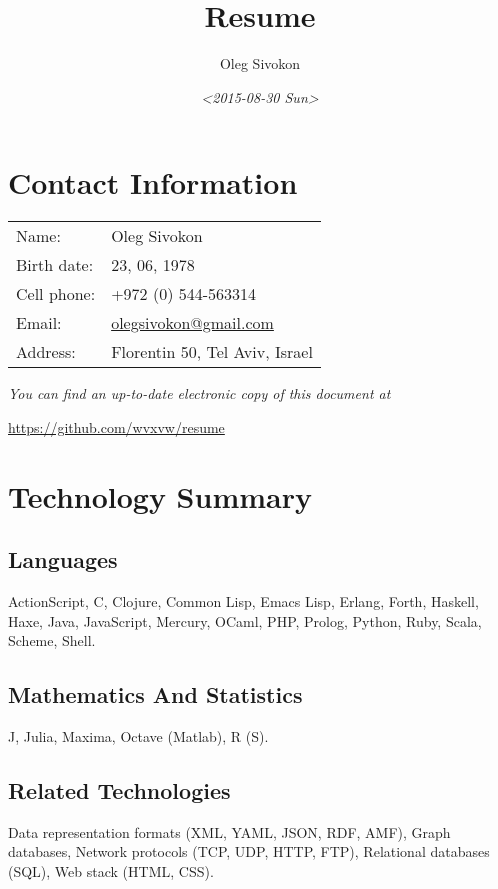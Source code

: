 \documentclass[11pt]{article}
\author{Oleg Sivokon}
\date{\textit{<2015-08-30 Sun>}}
\title{Resume}
\begin{document}
\maketitle

\section{Contact Information}
\label{sec:orgheadline1}
\begin{center}
\begin{tabular}{ll}
Name: & Oleg Sivokon\\
Birth date: & 23, 06, 1978\\
Cell phone: & +972 (0) 544-563314\\
Email: & \href{mailto:olegsivokon@gmail.com}{olegsivokon@gmail.com}\\
Address: & Florentin 50, Tel Aviv, Israel\\
\end{tabular}
\end{center}

\emph{You can find an up-to-date electronic copy of this document at}

\url{https://github.com/wvxvw/resume}

\clearpage

\section{Technology Summary}
\label{sec:orgheadline8}
\subsection{Languages}
\label{sec:orgheadline2}
ActionScript, C, Clojure, Common Lisp, Emacs Lisp, Erlang, Forth, Haskell,
Haxe, Java, JavaScript, Mercury, OCaml, PHP, Prolog, Python, Ruby, Scala,
Scheme, Shell.

\subsection{Mathematics And Statistics}
\label{sec:orgheadline3}
J, Julia, Maxima, Octave (Matlab), R (S).

\subsection{Related Technologies}
\label{sec:orgheadline4}
Data representation formats (XML, YAML, JSON, RDF, AMF), Graph databases,
Network protocols (TCP, UDP, HTTP, FTP), Relational databases (SQL), Web
stack (HTML, CSS).
\end{document}
